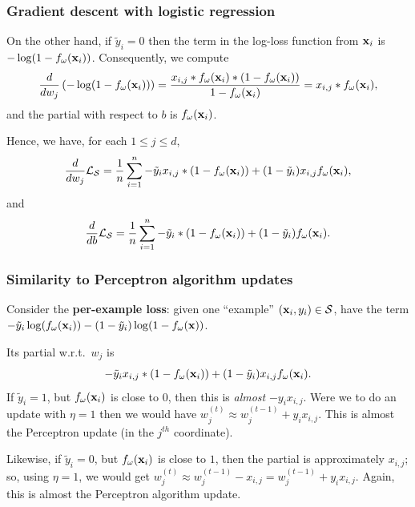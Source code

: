 \documentclass{beamer}
\theoremstyle{example}
\begin{document}
\begin{frame}
    \frametitle{Gradient descent with logistic regression}
    On the other hand, if $\tilde y_i = 0$ then the term in the log-loss function from ${\bf x}_i$ is $-\log(1-f_{\omega}({\bf x}_i))$. Consequently, we compute 
        \[\frac{d}{dw_j}\left( -\log(1-f_{\omega}({\bf x}_i)) \right) = \frac{x_{i,j}\ast f_{\omega}({\bf x}_i)\ast(1 - f_{\omega}({\bf x}_i))}{1-f_{\omega}({\bf x}_i)} = x_{i,j}\ast f_{\omega}({\bf x}_i),\]
and the partial with respect to $b$ is $f_{\omega}({\bf x}_i)$.

Hence, we have, for each $1\le j\le d$,
    \[\frac{d}{dw_j}\mathcal L_{\mathcal S} = \frac1n\sum_{i=1}^n -\tilde y_ix_{i,j}\ast(1-f_{\omega}({\bf x}_i)) + (1-\tilde y_i)x_{i,j}f_{\omega}({\bf x}_i),\]
and 
    \[\frac{d}{db}\mathcal L_{\mathcal S} = \frac1n\sum_{i=1}^n -\tilde y_i\ast(1-f_{\omega}({\bf x}_i)) + (1-\tilde y_i)f_{\omega}({\bf x}_i).\]
\end{frame}

\begin{frame}
    \frametitle{Similarity to Perceptron algorithm updates}
    Consider the \textbf{per-example loss}: given one ``example'' $({\bf x}_i, y_i) \in\mathcal S$, have the term $-\tilde y_i\log(f_{\omega}({\bf x}_i)) - (1 - \tilde y_i)\log(1 - f_{\omega}({\bf x}))$.

    Its partial w.r.t.\ $w_j$ is 
        \[-\tilde y_ix_{i,j}\ast(1-f_{\omega}({\bf x}_i)) + (1-\tilde y_i)x_{i,j}f_{\omega}({\bf x}_i).\]
    If $\tilde y_i=1$, but $f_{\omega}({\bf x}_i)$ is close to 0, then this is \textit{almost} $-y_i x_{i,j}$. Were we to do an update with $\eta=1$ then we would have $w_j^{(t)} \approx w_j^{(t-1)} + y_i x_{i,j}$. This is almost the Perceptron update (in the $j^{th}$ coordinate).

    Likewise, if $\tilde y_i=0$, but $f_{\omega}({\bf x}_i)$ is close to $1$, then the partial is approximately $x_{i,j}$; so, using $\eta=1$, we would get $w_j^{(t)} \approx w_j^{(t-1)} - x_{i,j} = w_j^{(t-1)} + y_ix_{i,j}$. Again, this is almost the Perceptron algorithm update.
\end{frame}
\end{document}
